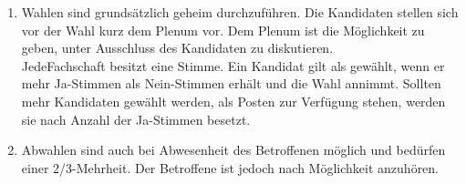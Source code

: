 \begin{enumerate}
\item{Wahlen sind grundsätzlich geheim durchzuführen. Die Kandidaten stellen sich vor der Wahl kurz
dem Plenum vor. Dem Plenum ist die Möglichkeit zu geben, unter Ausschluss des Kandidaten zu
diskutieren.\\
JedeFachschaft besitzt eine Stimme. Ein Kandidat gilt als gewählt,
wenn er mehr Ja-Stimmen als Nein-Stimmen erhält und die Wahl
annimmt. Sollten mehr Kandidaten gewählt werden, als Posten zur
Verfügung stehen, werden sie nach Anzahl der Ja-Stimmen besetzt.}

\item{Abwahlen sind auch bei Abwesenheit des Betroffenen möglich und bedürfen einer 2/3-Mehrheit.
Der Betroffene ist jedoch nach Möglichkeit anzuhören.}
\end{enumerate}



